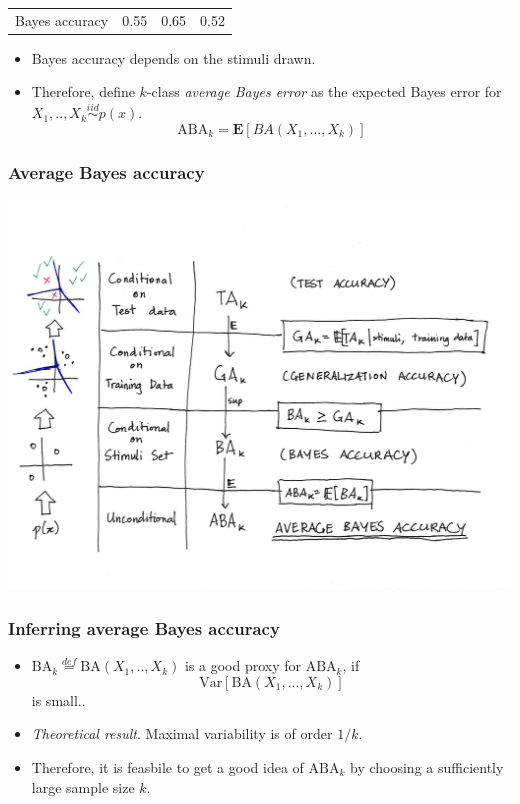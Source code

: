 \documentclass{beamer}
\newcommand{\E}{\textbf{E}}
\begin{document}
\begin{frame}
\begin{center}
\begin{tabular}{c|c|c|c}
Bayes accuracy & 0.55 & 0.65 & 0.52 \\
\end{tabular}
\end{center}
\begin{itemize}
\item Bayes accuracy depends on the stimuli drawn.
\item Therefore, define $k$-class \emph{average Bayes error} as the expected Bayes error for $X_1,..,X_k \stackrel{iid}{\sim} p(x)$.
\[
\text{ABA}_k = \E[BA(X_1,...,X_k)]
\]
\end{itemize}
\end{frame}

\begin{frame}
\frametitle{Average Bayes accuracy}
\includegraphics[scale = 0.45, clip = true, trim = 0in 1in 0.5in 1in]{ta_to_aba.png}
\end{frame}

\begin{frame}
\frametitle{Inferring average Bayes accuracy}

\begin{itemize}
\item $\text{BA}_k \stackrel{def}{=} \text{BA}(X_1,..,X_k)$ is a good proxy for $\text{ABA}_k$, if
\[
\text{Var}[\text{BA}(X_1,...,X_k)]
\]
is small..
\item \emph{Theoretical result}. Maximal variability is of order $1/k$.
\item Therefore, it is feasbile to get a good idea of $\text{ABA}_k$ by choosing a sufficiently large sample size $k$.
\end{itemize}
\end{frame}
\end{document}
